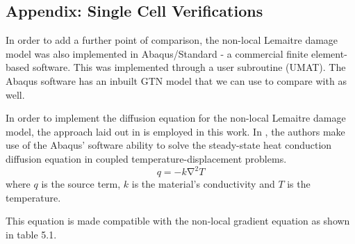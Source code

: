\documentclass[sn-mathphys,Numbered,draft]{sn-jnl}%
\begin{document}
\newpage

\begin{appendices}

\section{Appendix: Single Cell Verifications} \label{app:one_cell}

In order to add a further point of comparison, the non-local Lemaitre damage model was also implemented in Abaqus/Standard - a commercial finite element-based software. This was implemented through a user subroutine (UMAT). The Abaqus software has an inbuilt GTN model that we can use to compare with as well.

In order to implement the diffusion equation for the non-local Lemaitre damage model, the approach laid out in \citet{azinpour_simple_2018} is employed in this work. In \citet{azinpour_simple_2018}, the authors make use of the Abaqus' software ability to solve the steady-state heat conduction diffusion equation in coupled temperature-displacement problems. 
\begin{equation}
    q=-k\mathrm{\nabla}^2T
\end{equation}
where $q$ is the source term, $k$ is the material's conductivity and  $T$ is the temperature.

This equation is made compatible with the non-local gradient equation as shown in table 5.1.

\begin{table}[ht]
	\centering
{}
	\caption{Analogous set-up of the heat equation and non-local gradient equation}
	\label{tab:diffusion_equation_comparison}
\end{table}




\end{appendices}
\end{document}
